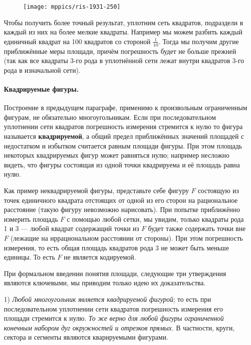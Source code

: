 \documentclass[oneside]{book}
\begin{document}
\begin{figure}
\centering
\texttt{[image: mppics/ris-1931-250]}
\caption{}\label{1931/ris-250}
\end{figure}

Чтобы получить более точный результат, уплотним сеть квадратов, подраздели в каждый из них на более
мелкие квадраты.
Например мы можем разбить каждый единичный квадрат на 100 квадратов со стороной $\tfrac1{10}$.
Тогда мы получим другие приближённые меры площади, причём погрешность будет не больше прежней (так как все квадраты 3-го рода в уплотнённой сети лежат внутри квадратов 3-го рода в изначальной сети).

\paragraph{Квадрируемые фигуры.}\label{extra/kvad-fig}
Построение в предыдущем параграфе, применимо к произвольным ограниченным фигурам, не обязательно многоугольникам.
Если при последовательном уплотнении сети квадратов погрешность измерения стремится к нулю
то фигура называется \textbf{квадрируемой}, а общий предел приближённых значений площадей с недостатком и избытком считается равным площади фигуры.
При этом площадь некоторых квадрируемых фигур может равняться нулю;
например несложно видеть, что фигуры состоящая из одной точки квадрируема и её площадь  равна нулю.

Как пример неквадрируемой фигуры, представьте себе фигуру $F$ состоящую из точек единичного квадрата отстоящих от одной из его сторон на рациональное расстояние (такую фигуру невозможно нарисовать). 
При попытке приближённо измерить площадь $F$ с помощью любой сетки, мы увидим, только квадраты рода 1 и 3 --- любой квадрат содержащий точки из $F$ будет также содержать точки вне $F$ (лежащие на иррациональном расстоянии от стороны).
При этом погрешность измерения, то есть общая площадь квадратов рода 3 не может быть меньше единицы. 
То есть $F$ не является кодируемой.

При формальном введении понятия площади, следующие три утверждения являются ключевыми, 
мы приводим только идею их доказательства.

1) \emph{Любой многоугольник является квадрируемой фигурой};
то есть при последовательном уплотнении сети квадратов погрешность измерения его площади стремится к нулю. \emph{То же верно для любой фигуры ограниченной конечным набором дуг окружностей и отрезков прямых.}
В частности, круги, сектора и сегменты являются кварируемыми фигурами.
\end{document}
